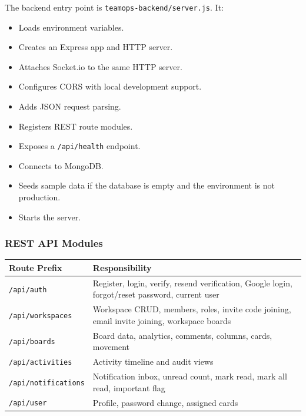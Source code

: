 \documentclass[
]{article}
\providecommand{\tightlist}{%
  \setlength{\itemsep}{0pt}\setlength{\parskip}{0pt}}
\begin{document}
The backend entry point is \texttt{teamops-backend/server.js}. It:

\begin{itemize}
\tightlist
\item
  Loads environment variables.
\item
  Creates an Express app and HTTP server.
\item
  Attaches Socket.io to the same HTTP server.
\item
  Configures CORS with local development support.
\item
  Adds JSON request parsing.
\item
  Registers REST route modules.
\item
  Exposes a \texttt{/api/health} endpoint.
\item
  Connects to MongoDB.
\item
  Seeds sample data if the database is empty and the environment is not
  production.
\item
  Starts the server.
\end{itemize}

\subsubsection{REST API Modules}\label{rest-api-modules}

{\def\LTcaptype{} %
\begin{longtable}[]{@{}
  >{\raggedright\arraybackslash}p{}
  >{\raggedright\arraybackslash}p{}@{}}
\toprule\noalign{}
\begin{minipage}[b]{\linewidth}\raggedright
Route Prefix
\end{minipage} & \begin{minipage}[b]{\linewidth}\raggedright
Responsibility
\end{minipage} \\
\midrule\noalign{}
\endhead
\bottomrule\noalign{}
\endlastfoot
\texttt{/api/auth} & Register, login, verify, resend verification,
Google login, forgot/reset password, current user \\
\texttt{/api/workspaces} & Workspace CRUD, members, roles, invite code
joining, email invite joining, workspace boards \\
\texttt{/api/boards} & Board data, analytics, comments, columns, cards,
movement \\
\texttt{/api/activities} & Activity timeline and audit views \\
\texttt{/api/notifications} & Notification inbox, unread count, mark
read, mark all read, important flag \\
\texttt{/api/user} & Profile, password change, assigned cards \\
\end{longtable}
}
\end{document}
